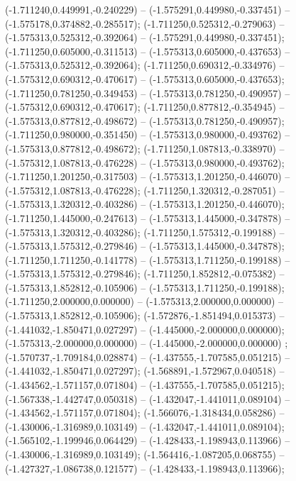  (-1.711240,0.449991,-0.240229) -- (-1.575291,0.449980,-0.337451) -- (-1.575178,0.374882,-0.285517);
 (-1.711250,0.525312,-0.279063) -- (-1.575313,0.525312,-0.392064) -- (-1.575291,0.449980,-0.337451);
 (-1.711250,0.605000,-0.311513) -- (-1.575313,0.605000,-0.437653) -- (-1.575313,0.525312,-0.392064);
 (-1.711250,0.690312,-0.334976) -- (-1.575312,0.690312,-0.470617) -- (-1.575313,0.605000,-0.437653);
 (-1.711250,0.781250,-0.349453) -- (-1.575313,0.781250,-0.490957) -- (-1.575312,0.690312,-0.470617);
 (-1.711250,0.877812,-0.354945) -- (-1.575313,0.877812,-0.498672) -- (-1.575313,0.781250,-0.490957);
 (-1.711250,0.980000,-0.351450) -- (-1.575313,0.980000,-0.493762) -- (-1.575313,0.877812,-0.498672);
 (-1.711250,1.087813,-0.338970) -- (-1.575312,1.087813,-0.476228) -- (-1.575313,0.980000,-0.493762);
 (-1.711250,1.201250,-0.317503) -- (-1.575313,1.201250,-0.446070) -- (-1.575312,1.087813,-0.476228);
 (-1.711250,1.320312,-0.287051) -- (-1.575313,1.320312,-0.403286) -- (-1.575313,1.201250,-0.446070);
 (-1.711250,1.445000,-0.247613) -- (-1.575313,1.445000,-0.347878) -- (-1.575313,1.320312,-0.403286);
 (-1.711250,1.575312,-0.199188) -- (-1.575313,1.575312,-0.279846) -- (-1.575313,1.445000,-0.347878);
 (-1.711250,1.711250,-0.141778) -- (-1.575313,1.711250,-0.199188) -- (-1.575313,1.575312,-0.279846);
 (-1.711250,1.852812,-0.075382) -- (-1.575313,1.852812,-0.105906) -- (-1.575313,1.711250,-0.199188);
 (-1.711250,2.000000,0.000000) -- (-1.575313,2.000000,0.000000) -- (-1.575313,1.852812,-0.105906);
 (-1.572876,-1.851494,0.015373) -- (-1.441032,-1.850471,0.027297) -- (-1.445000,-2.000000,0.000000);
 (-1.575313,-2.000000,0.000000) -- (-1.445000,-2.000000,0.000000) ;
 (-1.570737,-1.709184,0.028874) -- (-1.437555,-1.707585,0.051215) -- (-1.441032,-1.850471,0.027297);
 (-1.568891,-1.572967,0.040518) -- (-1.434562,-1.571157,0.071804) -- (-1.437555,-1.707585,0.051215);
 (-1.567338,-1.442747,0.050318) -- (-1.432047,-1.441011,0.089104) -- (-1.434562,-1.571157,0.071804);
 (-1.566076,-1.318434,0.058286) -- (-1.430006,-1.316989,0.103149) -- (-1.432047,-1.441011,0.089104);
 (-1.565102,-1.199946,0.064429) -- (-1.428433,-1.198943,0.113966) -- (-1.430006,-1.316989,0.103149);
 (-1.564416,-1.087205,0.068755) -- (-1.427327,-1.086738,0.121577) -- (-1.428433,-1.198943,0.113966);
